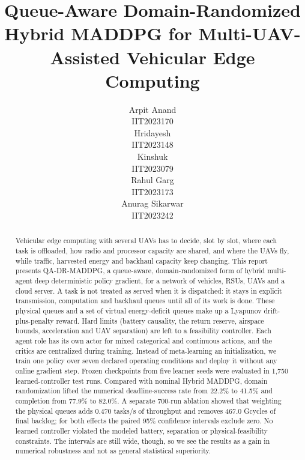 \documentclass[journal]{IEEEtran}
\newcommand{\method}{QA-DR-MADDPG}
\begin{document}
\title{Queue-Aware Domain-Randomized Hybrid MADDPG for Multi-UAV-Assisted Vehicular Edge Computing}

\author{
\begin{tabular}[t]{c}Arpit Anand\\IIT2023170\end{tabular}\quad
\begin{tabular}[t]{c}Hridayesh\\IIT2023148\end{tabular}\quad
\begin{tabular}[t]{c}Kinshuk\\IIT2023079\end{tabular}\quad
\begin{tabular}[t]{c}Rahul Garg\\IIT2023173\end{tabular}\quad
\begin{tabular}[t]{c}Anurag Sikarwar\\IIT2023242\end{tabular}
}

\maketitle

\begin{abstract}
Vehicular edge computing with several UAVs has to decide, slot by slot, where
each task is offloaded, how radio and processor capacity are shared, and
where the UAVs fly, while traffic, harvested energy and backhaul capacity
keep changing. This report presents \method, a queue-aware,
domain-randomized form of hybrid multi-agent deep deterministic policy
gradient, for a network of vehicles, RSUs, UAVs and a cloud server. A task
is not treated as served when it is dispatched: it stays in explicit
transmission, computation and backhaul queues until all of its work is done.
These physical queues and a set of virtual energy-deficit queues make up a
Lyapunov drift-plus-penalty reward. Hard limits (battery causality, the
return reserve, airspace bounds, acceleration and UAV separation) are left to
a feasibility controller. Each agent role has its own actor for mixed
categorical and continuous actions, and the critics are centralized during
training. Instead of meta-learning an initialization, we train one policy
over seven declared operating conditions and deploy it without any online
gradient step. Frozen checkpoints from five learner seeds were evaluated in
1,750 learned-controller test runs. Compared with nominal Hybrid MADDPG,
domain randomization lifted the numerical deadline-success rate from 22.2\%
to 41.5\% and completion from 77.9\% to 82.0\%. A separate 700-run ablation
showed that weighting the physical queues adds 0.470 tasks/s of throughput
and removes 467.0 Gcycles of final backlog; for both effects the paired
95\% confidence intervals exclude zero. No learned controller violated the
modeled battery, separation or physical-feasibility constraints. The
intervals are still wide, though, so we see the results as a gain in
numerical robustness and not as general statistical superiority.
\end{abstract}
\end{document}
